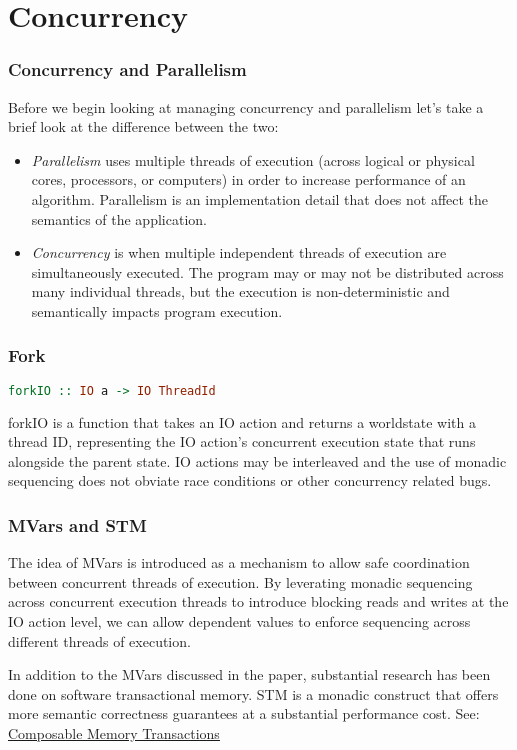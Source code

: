 \documentclass{beamer}
\newcommand{\chref}[3] {
  {\color{#1} \href{#2}{\underline{#3}}}
}
\begin{document}
\section{Concurrency}
\begin{frame}
  \frametitle{Concurrency and Parallelism}
  Before we begin looking at managing concurrency and parallelism
  let's take a brief look at the difference between the two:
  \begin{itemize}
  \item \emph{Parallelism} uses multiple threads of execution (across
    logical or physical cores, processors, or computers) in order to
    increase performance of an algorithm.  Parallelism is an
    implementation detail that does not affect the semantics of the
    application.
  \item \emph{Concurrency} is when multiple independent threads of
    execution are simultaneously executed.  The program may or may not
    be distributed across many individual threads, but the execution
    is non-deterministic and semantically impacts program execution.
  \end{itemize}
\end{frame}

\begin{frame}[fragile]
  \frametitle{Fork}
\begin{lstlisting}[language=haskell]
forkIO :: IO a -> IO ThreadId
\end{lstlisting}
  forkIO is a function that takes an IO action and returns a
  worldstate with a thread ID, representing the IO action's concurrent
  execution state that runs alongside the parent state.  IO actions
  may be interleaved and the use of monadic sequencing does not
  obviate race conditions or other concurrency related bugs.
\end{frame}

\begin{frame}
  \frametitle{MVars and STM}
  The idea of MVars is introduced as a mechanism to allow safe
  coordination between concurrent threads of execution.  By leverating
  monadic sequencing across concurrent execution threads to introduce
  blocking reads and writes at the IO action level, we can allow
  dependent values to enforce sequencing across different threads of
  execution.

  In addition to the MVars discussed in the paper, substantial
  research has been done on software transactional memory.  STM is a
  monadic construct that offers more semantic correctness guarantees
  at a substantial performance cost.  See: \chref{blue}{https://simonmar.github.io/bib/papers/stm.pdf}{Composable Memory Transactions}
\end{frame}
\end{document}
